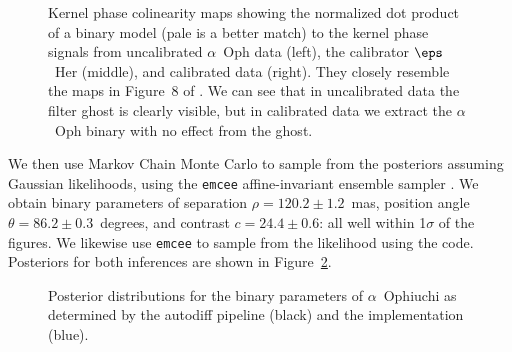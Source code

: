 \documentclass[modern]{aastex63}
\begin{document}
\begin{figure}
\caption{Kernel phase colinearity maps showing the normalized dot product of a binary model (pale is a better match) to the kernel phase signals from uncalibrated $\alpha$~Oph data (left), the calibrator $\eps$~Her (middle), and calibrated data (right). They closely resemble the maps in Figure~8 of \citet{martinache20}. We can see that in uncalibrated data the filter ghost is clearly visible, but in calibrated data we extract the $\alpha$~Oph binary with no effect from the ghost. \href{https://github.com/benjaminpope/morphine/blob/stable/notebooks/pharo_test.ipynb}{\color{linkcolor}\faGithub} \label{colinearity}}
\end{figure}

We then use Markov Chain Monte Carlo \citep{metropolis53} to sample from the posteriors assuming Gaussian likelihoods, using the \texttt{emcee} affine-invariant ensemble sampler \citep{emcee}. We obtain binary parameters of separation $\rho = 120.2 \pm 1.2$~mas, position angle $\theta = 86.2 \pm 0.3$~degrees, and contrast $c = 24.4 \pm 0.6$: all well within 1$\sigma$ of the \citet{martinache20} figures. We likewise use \texttt{emcee} to sample from the likelihood using the \citet{martinache20} code. Posteriors for both inferences are shown in Figure~\ref{comparison_posterior}.

\begin{figure}
\caption{Posterior distributions for the binary parameters of $\alpha$~Ophiuchi as determined by the autodiff pipeline (black) and the \citet{martinache20} implementation (blue). \href{https://github.com/benjaminpope/morphine/blob/stable/notebooks/frantz_test.ipynb}{\color{linkcolor}\faGithub} \label{comparison_posterior}}
\end{figure}

\end{document}
